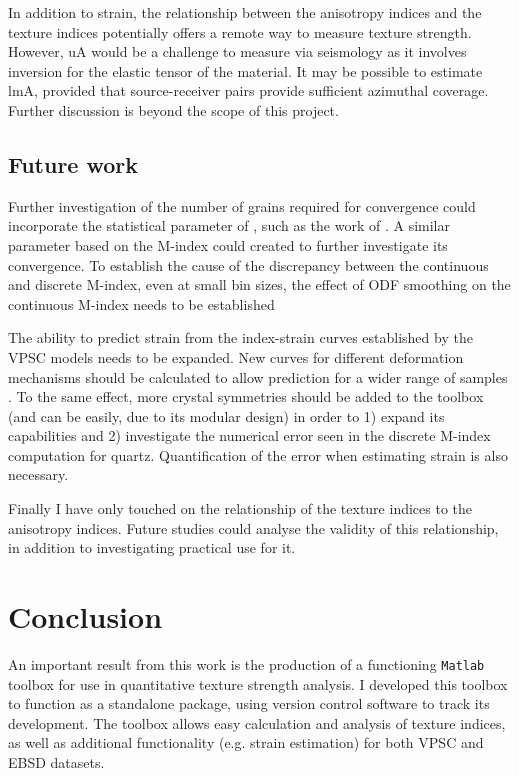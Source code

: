 \documentclass[a4paper,12pt,twoside]{report}
\numberwithin{equation}{chapter}
\begin{document}
In addition to strain, the relationship between the anisotropy indices and the texture indices potentially offers a remote way to measure texture strength. However, uA would be a challenge to measure via seismology as it involves inversion for the elastic tensor of the material. It may be possible to estimate lmA, provided that source-receiver pairs provide sufficient azimuthal coverage. Further discussion is beyond the scope of this project.   
  


\section{Future work}

Further investigation of the number of grains required for convergence could incorporate the statistical parameter of \cite{Pospiech1994}, such as the work of \cite{Bozzolo2007}. A similar parameter based on the M-index could created to further investigate its convergence. To establish the cause of the discrepancy between the continuous and discrete M-index, even at small bin sizes, the effect of ODF smoothing on the continuous M-index needs to be established \citep[possibly by analysing the kernel method of][]{Hielscher2008} 

The ability to predict strain from the index-strain curves established by the VPSC models needs to be expanded. New curves for different deformation mechanisms should be calculated to allow prediction for a wider range of samples \citep[possibly using more advanced modelling e.g.][]{PonteCastañeda2002}. To the same effect, more crystal symmetries should be added to the toolbox (and can be easily, due to its modular design) in order to 1) expand its capabilities and 2) investigate the numerical error seen in the discrete M-index computation for quartz. Quantification of the error when estimating strain is also necessary.

Finally I have only touched on the relationship of the texture indices to the anisotropy indices. Future studies could analyse the validity of this relationship, in addition to investigating practical use for it.  



\chapter{Conclusion} \label{chap:conclusion}
\vspace{-1cm}
An important result from this work is the production of a functioning \texttt{Matlab} toolbox for use in quantitative texture strength analysis. I developed this toolbox to function as a standalone package, using version control software to track its development. The toolbox allows easy calculation and analysis of texture indices, as well as additional functionality (e.g. strain estimation) for both VPSC and EBSD datasets. 
\end{document}
